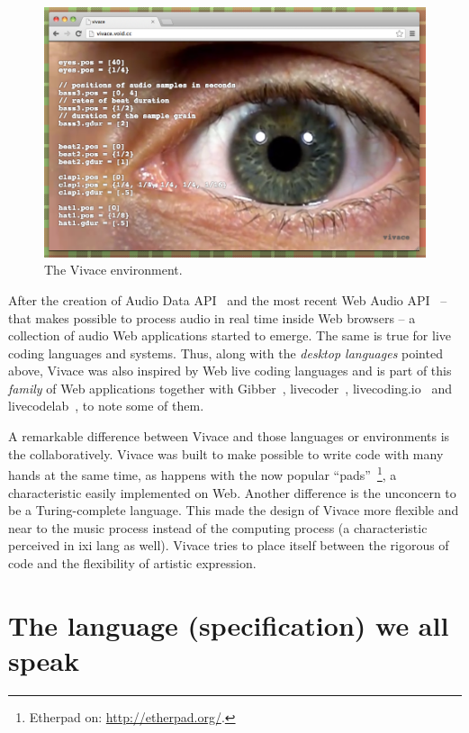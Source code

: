 \documentclass[letterpaper, 12pt]{article}
\begin{document}
\begin{figure}[htpb]
  \begin{center}
    \includegraphics[scale=.3]{img/fig_vivace.png}
    \caption{The Vivace environment.}
    \label{fig:vivace}
  \end{center}
\end{figure}

After the creation of Audio Data API~\citep*{audiodata} and the most
recent Web Audio API~\citep*{webaudio} -- that makes possible to
process audio in real time inside Web browsers -- a collection of
audio Web applications started to emerge. The same is true for live
coding languages and systems.  Thus, along with the \textit{desktop
  languages} pointed above, Vivace was also inspired by Web live
coding languages and is part of this \textit{family} of Web
applications together with Gibber~\citep*{gibber},
livecoder~\citep*{livecoder}, livecoding.io~\citep*{livecodingio} and
livecodelab~\citep*{livecodelab}, to note some of them.

A remarkable difference between Vivace and those languages or
environments is the collaboratively. Vivace was built to make possible
to write code with many hands at the same time, as happens with the
now popular ``pads''~\footnote{Etherpad on:
  \url{http://etherpad.org/}.}, a characteristic easily implemented on
Web.  Another difference is the unconcern to be a Turing-complete
language. This made the design of Vivace more flexible and near to the
music process instead of the computing process (a characteristic
perceived in ixi lang as well). Vivace tries to place itself between
the rigorous of code and the flexibility of artistic expression.

\section{The language (specification) we all speak}
\end{document}

